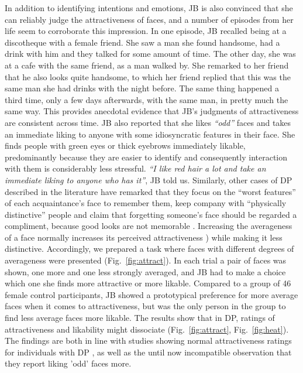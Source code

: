 \documentclass[fleqn,10pt]{SelfArx} %
\begin{document}
In addition to identifying intentions and emotions, JB is also convinced that she can reliably judge the attractiveness of faces, and a number of episodes from her life seem to corroborate this impression.
In one episode, JB recalled being at a discotheque with a female friend. She saw a man she found handsome, had a drink with him and they talked for some amount of time. The other day, she was at a cafe with the same friend, as a man walked by. She remarked to her friend that he also looks quite handsome, to which her friend replied that this was the same man she had drinks with the night before. The same thing happened a third time, only a few days afterwards, with the same man, in pretty much the same way. This provides anecdotal evidence that JB's judgments of attractiveness are consistent across time.
JB also reported that she likes \textit{“odd”} faces and takes an immediate liking to anyone with some idiosyncratic features in their face. She finds people with green eyes or thick eyebrows immediately likable, predominantly because they are easier to identify and consequently interaction with them is considerably less stressful. \textit{“I like red hair a lot and take an immediate liking to anyone who has it”}, JB told us. Similarly, other cases of DP described in the literature have remarked that they focus on the “worst features” of each acquaintance's face to remember them, keep company with “physically distinctive” people and claim that forgetting someone's face should be regarded a compliment, because good looks are not memorable \citep{Fine_2012}.
Increasing the averageness of a face normally increases its perceived attractiveness \citep{Little_2011}) while making it less distinctive. Accordingly, we prepared a task where faces with different degrees of averageness were presented (Fig.~\ref{fig:attract}). In each trial a pair of faces was shown, one more and one less strongly averaged, and JB had to make a choice which one she finds more attractive or more likable. Compared to a group of 46 female control participants, JB showed a prototypical preference for more average faces when it comes to attractiveness, but was the only person in the group to find less average faces more likable. The results show that in DP, ratings of attractiveness and likability might dissociate (Fig.~\ref{fig:attract}, Fig.~\ref{fig:heat}). The findings are both in line with studies showing normal attractiveness ratings for individuals with DP \citep{Carbon_2010}, as well as the until now incompatible observation that they report liking 'odd' faces more.
\end{document}
